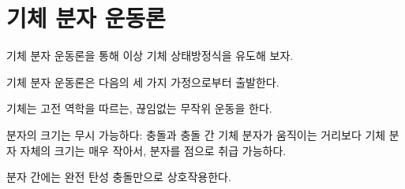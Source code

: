         \section{기체 분자 운동론}
            \hspace{\parindent} 기체 분자 운동론을 통해 이상 기체 상태방정식을 유도해 보자.
            \begin{rem}[기체 분자 운동론의 가정]
            기체 분자 운동론은 다음의 세 가지 가정으로부터 출발한다.
                \begin{enum}
                    \item 기체는 고전 역학을 따르는, 끊임없는 무작위 운동을 한다.
                    \item 분자의 크기는 무시 가능하다: 충돌과 충돌 간 기체 분자가 움직이는 거리보다 기체 분자 자체의 크기는 매우 작아서, 분자를 점으로 취급 가능하다.
                    \item 분자 간에는 완전 탄성 충돌만으로 상호작용한다.
                \end{enum}
            \end{rem}
